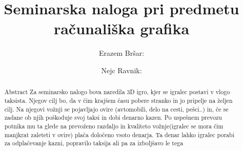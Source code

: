 \documentclass[a4paper]{article}
\begin{document}
\title{Seminarska naloga pri predmetu računališka grafika}

\author{ \large {Erazem Bršar}:  
	\and \hspace*{-3em} \large{ Nejc Ravnik}:   } 

\maketitle


\begin{abstract}{Abstract}
	Za seminarsko nalogo bova naredila 3D igro, kjer se igralec postavi v vlogo taksista. Njegov cilj bo, da v čim krajšem času pobere stranko in jo pripelje na željen cilj. Na njegovi vožnji se pojavljajo ovire (avtomobili, delo na cesti, pešci..) in, če se zadane ob njih poškoduje svoj taksi in dobi denarno kazen. Po uspešnem prevozu potnika mu ta glede na prevoženo razdaljo in kvaliteto vožnje(igralec se mora čim manjkrat zaleteti v ovire) plača določeno vsoto denarja. Ta denar lahko igralec porabi za odplačevanje kazni, popravilo taksija ali pa za izboljšavo le tega\end{abstract}
\end{document}
